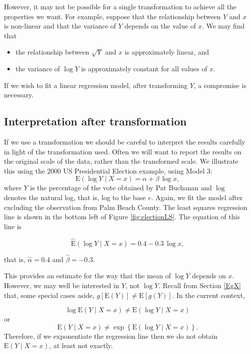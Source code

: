\documentclass[
  british,
  11pt,
  openany, a4paper]{book}
\providecommand{\tightlist}{%
  \setlength{\itemsep}{0pt}\setlength{\parskip}{0pt}}
\begin{document}
However, it may not be possible for a single transformation to achieve all the properties we want. For example, suppose that the relationship between \(Y\) and \(x\) is non-linear and that the variance of \(Y\) depends on the value of \(x\). We may find that

\begin{itemize}
\tightlist
\item
  the relationship between \(\sqrt{Y}\) and \(x\) is approximately linear, and
\item
  the variance of \(\log Y\) is approximately constant for all values of \(x\).
\end{itemize}

If we wish to fit a linear regression model, after transforming \(Y\), a compromise is necessary.

\subsection{Interpretation after transformation}\label{interpretation-after-transformation}

If we use a transformation we should be careful to interpret the results carefully in light of the transformation used. Often we will want to report the results on the original scale of the data, rather than the transformed scale. We illustrate this using the 2000 US Presidential Election example, using Model 3:
\[ \text{E}(\log Y \mid X=x) = \alpha+\beta\,\log x, \]
where \(Y\) is the percentage of the vote obtained by Pat Buchanan and \(\log\) denotes the natural log, that is, log to the base \(e\). Again, we fit the model after excluding the observation from Palm Beach County. The least squares regression line is shown in the bottom left of Figure \ref{fig:electionLS}. The equation of this line is

\[ \widehat{\text{E}}(\log Y \mid X=x) = 0.4 - 0.3\,\log x, \]

that is, \(\hat{\alpha} = 0.4\) and \(\hat{\beta} = -0.3\).

This provides an estimate for the way that the mean of \(\log Y\) depends on \(x\). However, we may well be interested in \(Y\), not \(\log Y\). Recall from Section \ref{EgX} that, some special cases aside, \(g[\text{E}(Y)] \neq \text{E}[g(Y)].\) In the current context,

\[ \log \text{E}(Y \mid X=x) \neq \text{E}(\log Y \mid X=x) \]
or
\[ \text{E}(Y \mid X=x) \neq \exp \left\{ \text{E}(\log Y \mid X=x) \right\}. \]
Therefore, if we exponentiate the regression line then we do not obtain \(\text{E}(Y \mid X=x)\), at least not exactly.
\end{document}
